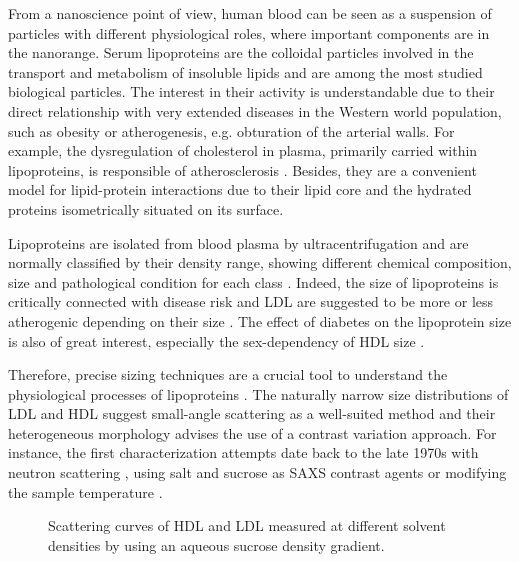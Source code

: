 From a nanoscience point of view, human blood can be seen as a suspension of particles with different physiological roles, where important components are in the nanorange. Serum lipoproteins are the colloidal particles involved in the transport and metabolism of insoluble lipids and are among the most studied biological particles. The interest in their activity is understandable due to their direct relationship with very extended diseases in the Western world population, such as obesity or atherogenesis, e.g. obturation of the arterial walls. For example, the dysregulation of cholesterol in plasma, primarily carried within lipoproteins, is responsible of atherosclerosis \citep{munro_pathogenesis_1988}. Besides, they are a convenient model for lipid-protein interactions \citep{assmann_lipid-protein_1974} due to their lipid core and the hydrated proteins isometrically situated on its surface.

Lipoproteins are isolated from blood plasma by ultracentrifugation \citep{havel_distribution_1955} and are normally classified by their density range, showing different chemical composition, size and pathological condition for each class \citep{german_lipoproteins:_2006}. Indeed, the size of lipoproteins is critically connected with disease risk \citep{gardner_association_1996} and LDL are suggested to be more or less atherogenic depending on their size \citep{dreon_low-density_1994}. The effect of diabetes on the lipoprotein size is also of great interest, especially the sex-dependency of HDL size \citep{colhoun_lipoprotein_2002}.

Therefore, precise sizing techniques are a crucial tool to understand the physiological processes of lipoproteins \citep{german_lipoproteins:_2006}. The naturally narrow size distributions of LDL and HDL suggest small-angle scattering as a well-suited method and their heterogeneous morphology advises the use of a contrast variation approach. For instance, the first characterization attempts date back to the late 1970s with neutron scattering \citep{stuhrmann_neutron_1975}, using salt \citep{tardieu_structure_1976} and sucrose \citep{muller_structure_1978} as SAXS contrast agents or modifying the sample temperature \citep{laggner_molecular_1977,luzzati_structure_1979}. 

\begin{figure}
	\centering
		\subfloat[HDL]{\resizebox{0.44\linewidth}{!}{\figfont{13pt}}\label{fig:HDLContinuousSAXS}}
		\qquad
		\subfloat[LDL]{\resizebox{0.44\linewidth}{!}{\figfont{13pt}}\label{fig:LDLContinuousSAXS}}
		\caption[Continuous contrast variation experimental data of HDL and LDL.]{Scattering curves of HDL and LDL measured at different solvent densities by using an aqueous sucrose density gradient.}
\end{figure}

